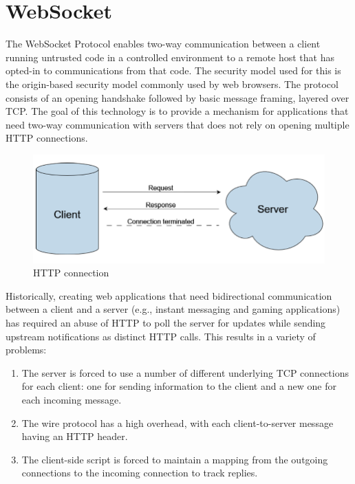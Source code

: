 \section{WebSocket}
	The WebSocket Protocol \cite{websocket} enables two-way communication between a client
	running untrusted code in a controlled environment to a remote host
	that has opted-in to communications from that code.  The security
	model used for this is the origin-based security model commonly used
	by web browsers.  The protocol consists of an opening handshake
	followed by basic message framing, layered over TCP.  The goal of
	this technology is to provide a mechanism for applications that need two-way communication with servers that does
	not rely on opening multiple HTTP connections.

	\begin{figure}[h!]
		\includegraphics{include/imgs/http.PNG}
		\caption{HTTP connection}
	\end{figure}

	Historically, creating web applications that need bidirectional
	communication between a client and a server (e.g., instant messaging
	and gaming applications) has required an abuse of HTTP to poll the
	server for updates while sending upstream notifications as distinct
	HTTP calls.
	This results in a variety of problems:

	\begin{enumerate}
		\item The server is forced to use a number of different underlying TCP
		connections for each client: one for sending information to the
		client and a new one for each incoming message.
		\item The wire protocol has a high overhead, with each client-to-server
		message having an HTTP header.
		\item The client-side script is forced to maintain a mapping from the
		outgoing connections to the incoming connection to track replies.
	\end{enumerate}


